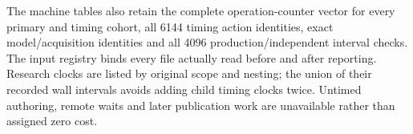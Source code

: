 The machine tables also retain the complete operation-counter vector for every primary and timing cohort, all 6144 timing action identities, exact model/acquisition identities and all 4096 production/independent interval checks. The input registry binds every file actually read before and after reporting. Research clocks are listed by original scope and nesting; the union of their recorded wall intervals avoids adding child timing clocks twice. Untimed authoring, remote waits and later publication work are unavailable rather than assigned zero cost.

